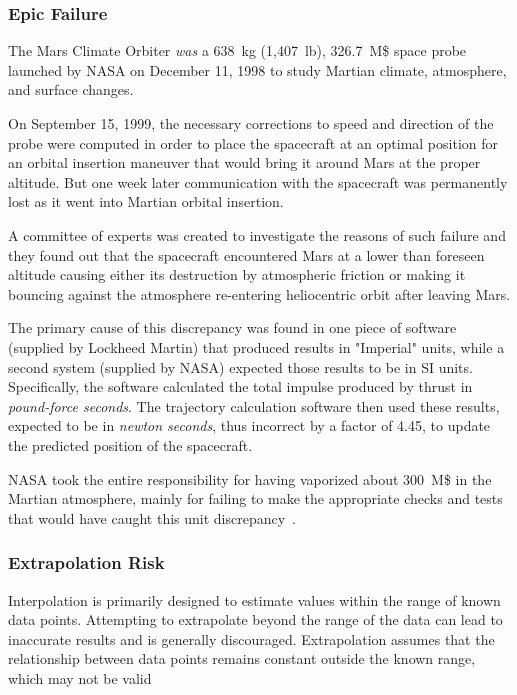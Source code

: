 \begin{curiosity}
\subsubsection{Epic Failure}
The Mars Climate Orbiter \emph{was} a 638~kg (1,407~lb), 326.7~M\$ space probe launched by NASA on December 11, 1998 to study Martian climate, atmosphere, and surface changes. 

On September 15, 1999, the necessary corrections to speed and direction of the probe were computed in order to place the spacecraft at an optimal position for an orbital insertion maneuver that would bring it around Mars at the proper altitude. 
But one week later communication with the spacecraft was permanently lost as it went into Martian orbital insertion. 

A committee of experts was created to investigate the reasons of 
such failure and they found out that the spacecraft encountered Mars at a lower than foreseen altitude causing either its destruction by atmospheric friction or making it bouncing against the atmosphere re-entering heliocentric orbit after leaving Mars.

The primary cause of this discrepancy was found in one piece of software (supplied by Lockheed Martin) that produced results in "Imperial" units,  while a second system (supplied by NASA) expected those results to be in SI units. Specifically, the software calculated the total impulse produced by thrust in \emph{pound-force seconds}. The trajectory calculation software then used these results, expected to be in \emph{newton seconds}, thus incorrect by a factor of 4.45, to update the predicted position of the spacecraft.
	
NASA took the entire responsibility for having vaporized about 300~M\$ in the Martian atmosphere, mainly for failing to make the appropriate checks and tests that would have caught this unit discrepancy~\cite{bib:mars}.	
\end{curiosity}

\subsubsection{Extrapolation Risk}

Interpolation is primarily designed to estimate values within the range of known data points. Attempting to extrapolate beyond the range of the data can lead to inaccurate results and is generally discouraged. Extrapolation assumes that the relationship between data points remains constant outside the known range, which may not be valid

